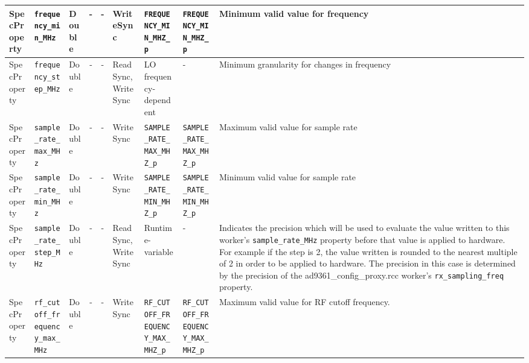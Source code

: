 \documentclass{article}
\begin{document}
\begin{landscape}
\begin{scriptsize}
\begin{longtable}{|p{1.8cm}|p{4.1cm}|p{1cm}|c|c|p{1.6cm}|p{3.7cm}|p{3.7cm}|p{2.5cm}|}
			\hline
			SpecProperty & \verb+frequency_min_MHz+            & Double& -        & -          & WriteSync      & \verb+FREQUENCY_MIN_MHZ_p+ & \verb+FREQUENCY_MIN_MHZ_p+ & Minimum valid value for frequency                                                                                                                                                                                           \\
			\hline
			SpecProperty & \verb+frequency_step_MHz+           & Double& -        & -          & ReadSync, WriteSync & LO frequency-dependent & - & Minimum granularity for changes in frequency                                                                                                                                                                                \\
			\hline
			SpecProperty & \verb+sample_rate_max_MHz+          & Double& -        & -          & WriteSync & \verb+SAMPLE_RATE_MAX_MHZ_p+ & \verb+SAMPLE_RATE_MAX_MHZ_p+ & Maximum valid value for sample rate                                                                                                                                                                                         \\
			\hline
			SpecProperty & \verb+sample_rate_min_MHz+          & Double& -        & -          & WriteSync & \verb+SAMPLE_RATE_MIN_MHZ_p+ & \verb+SAMPLE_RATE_MIN_MHZ_p+ & Minimum valid value for sample rate                                                                                                                                                                                         \\
			\hline
			SpecProperty & \verb+sample_rate_step_MHz+         & Double& -        & -          & ReadSync, WriteSync & Runtime-variable & - & Indicates the precision which will be used to evaluate the value written
        to this worker's \verb+sample_rate_MHz+ property
        before that value is applied to hardware. For example if the step is 2,
        the value written is rounded to the nearest multiple of 2 in order to
        be applied to hardware. The precision in this case is determined by the
        precision of the ad9361\_config\_proxy.rcc worker's
        \verb+rx_sampling_freq+ property.                                                                                                                                                                              \\
			\hline
			SpecProperty & \verb+rf_cutoff_frequency_max_MHz+  & Double& -        & -          & WriteSync      & \verb+RF_CUTOFF_FREQUENCY_MAX_MHZ_p+ & \verb+RF_CUTOFF_FREQUENCY_MAX_MHZ_p+ & Maximum valid value for RF cutoff frequency. \\

\end{longtable}
\end{scriptsize}
\end{landscape}
\end{document}
